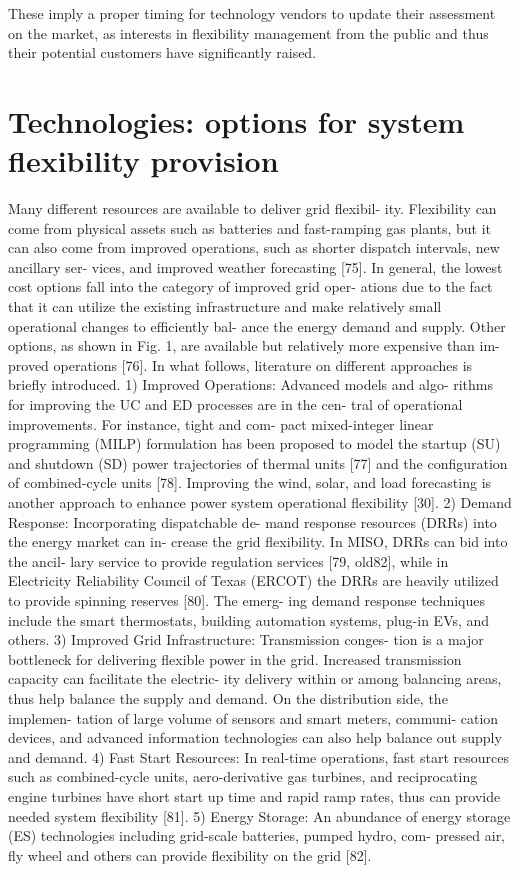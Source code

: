 These imply a proper timing for technology vendors to update their assessment on the market, as interests in flexibility management from the public and thus their potential customers have significantly raised.

\section{Technologies: options for system flexibility provision}

Many different resources are available to deliver grid flexibil- ity. Flexibility can come from physical assets such as batteries and fast-ramping gas plants, but it can also come from improved operations, such as shorter dispatch intervals, new ancillary ser- vices, and improved weather forecasting [75]. In general, the lowest cost options fall into the category of improved grid oper- ations due to the fact that it can utilize the existing infrastructure and make relatively small operational changes to efficiently bal- ance the energy demand and supply. Other options, as shown in Fig. 1, are available but relatively more expensive than im-proved operations [76]. In what follows, literature on different approaches is briefly introduced.
1) Improved Operations: Advanced models and algo- rithms for improving the UC and ED processes are in the cen- tral of operational improvements. For instance, tight and com- pact mixed-integer linear programming (MILP) formulation has been proposed to model the startup (SU) and shutdown (SD) power trajectories of thermal units [77] and the configuration of combined-cycle units [78]. Improving the wind, solar, and load forecasting is another approach to enhance power system operational flexibility [30].
2) Demand Response: Incorporating dispatchable de- mand response resources (DRRs) into the energy market can in- crease the grid flexibility. In MISO, DRRs can bid into the ancil- lary service to provide regulation services [79, old82], while in Electricity Reliability Council of Texas (ERCOT) the DRRs are heavily utilized to provide spinning reserves [80]. The emerg- ing demand response techniques include the smart thermostats, building automation systems, plug-in EVs, and others.
3) Improved Grid Infrastructure: Transmission conges- tion is a major bottleneck for delivering flexible power in the grid. Increased transmission capacity can facilitate the electric- ity delivery within or among balancing areas, thus help balance the supply and demand. On the distribution side, the implemen- tation of large volume of sensors and smart meters, communi- cation devices, and advanced information technologies can also help balance out supply and demand.
4) Fast Start Resources: In real-time operations, fast start resources such as combined-cycle units, aero-derivative gas turbines, and reciprocating engine turbines have short start up time and rapid ramp rates, thus can provide needed system flexibility [81].
5) Energy Storage: An abundance of energy storage (ES) technologies including grid-scale batteries, pumped hydro, com- pressed air, fly wheel and others can provide flexibility on the grid [82]. \cite{Wang2017}




